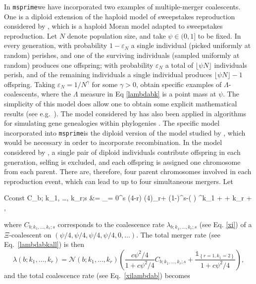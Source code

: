 \documentclass{article}
\newcommand{\msprime}[0]{\texttt{msprime}}
\newcommand{\msprime}[0]{{\texttt{msprime} }}
\newcommand{\be}{\begin{equation}}
\newcommand{\ee}{\end{equation}}
\newcommand{\one}[1]{\ensuremath{\mathds{1}_{\left\{ #1 \right\}}}}%
\begin{document}
In \msprime we have incorporated two examples of multiple-merger
coalescents.  One is a diploid extension \citep{BBE13} of the haploid
model of sweepstakes reproduction considered by \cite{EW06}, which is
a haploid Moran model adapted to sweepstakes reproduction.  Let $N$
denote population size, and take $\psi \in (0,1]$ to be fixed.  In
every generation, with probability $1-\varepsilon_N$ a single
individual (picked uniformly at random) perishes, and one of the
surviving individuals (sampled uniformly at random) produces one
offspring; with probability $\varepsilon_N$ a total of
$\lfloor \psi N \rfloor$ individuals perish, and of the remaining
individuals a single individual produces $\lfloor \psi N \rfloor -1 $
offspring.  Taking $\varepsilon_N = 1/N^\gamma$ for some $\gamma > 0$,
\cite{EW06} obtain specific examples of $\Lambda$-coalescents, where
the $\Lambda$ measure in Eq \eqref{lambdabk} is a point mass at
$\psi$.  The simplicity of this model does allow one to obtain some
explicit mathematical results (see e.g.\
\cite{EF2018,Matuszewski2017,Der2012,Freund2020}). The model
considered by \cite{EW06} has also been applied in algorithms for
simulating gene genealogies within phylogenies \citep{Zhu2015}. The
 specific model incorporated into \msprime is the diploid version
\citep{BBE13} of the model studied by \cite{EW06}, which would be
necessary in order to incorporate recombination.  In the model
considered by \cite{BBE13}, a single pair of diploid individuals
contribute offspring in each generation, selfing is excluded, and each
offspring is assigned one chromosome from each parent. There are,
therefore, four parent chromosomes involved in each reproduction
event, which can lead to up to four simultaneous mergers.  Let
\begin{esplit}{Cconst}
C_{b; k_1, \ldots, k_r;s } &=   \sum_{\ell = 0}^{s \wedge (4-r)}  (4)_{r+\ell} (1-\psi)^{s-\ell }\left(  \right) ^{k_1 + \cdots + k_r + \ell},  \\
\end{esplit}
where  $C_{b; k_1, \ldots, k_r;s }$ corresponds to the coalescence rate $ \lambda_{b;k_1, \ldots, k_r;s}$ (see Eq. \eqref{xi}) of a  $\Xi$-coalescent on  $(\psi/4, \psi/4, \psi/4, \psi/4, 0, \ldots)$.
The total merger rate (see Eq.\ \eqref{lambdabkall}) is then 
\be\label{xidirlambdabk}
      \lambda(b;k_1, \ldots, k_r) =    \mathcal{N}(b; k_1, \ldots, k_r ) \left( \frac{c\psi^2/4}{1 +  c\psi^2/4}C_{b; k_1, \ldots, k_r;s } +     \frac{ \one{r=1, k_1 = 2} }{1 +  c\psi^2/4}  \right),
\ee
and the total coalescence rate (see Eq.\ \eqref{xilambdab}) becomes
\end{document}
